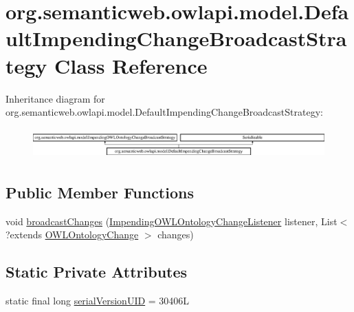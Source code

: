 \hypertarget{classorg_1_1semanticweb_1_1owlapi_1_1model_1_1_default_impending_change_broadcast_strategy}{\section{org.\-semanticweb.\-owlapi.\-model.\-Default\-Impending\-Change\-Broadcast\-Strategy Class Reference}
\label{classorg_1_1semanticweb_1_1owlapi_1_1model_1_1_default_impending_change_broadcast_strategy}
}
Inheritance diagram for org.\-semanticweb.\-owlapi.\-model.\-Default\-Impending\-Change\-Broadcast\-Strategy\-:\begin{figure}[H]
\begin{center}
\leavevmode
\includegraphics[height=1.166667cm]{classorg_1_1semanticweb_1_1owlapi_1_1model_1_1_default_impending_change_broadcast_strategy}
\end{center}
\end{figure}
\subsection*{Public Member Functions}
\begin{DoxyCompactItemize}
\item 
void \hyperlink{classorg_1_1semanticweb_1_1owlapi_1_1model_1_1_default_impending_change_broadcast_strategy_a1d03697fd178c0b4ca1d66fd7060c265}{broadcast\-Changes} (\hyperlink{interfaceorg_1_1semanticweb_1_1owlapi_1_1model_1_1_impending_o_w_l_ontology_change_listener}{Impending\-O\-W\-L\-Ontology\-Change\-Listener} listener, List$<$?extends \hyperlink{classorg_1_1semanticweb_1_1owlapi_1_1model_1_1_o_w_l_ontology_change}{O\-W\-L\-Ontology\-Change} $>$ changes)
\end{DoxyCompactItemize}
\subsection*{Static Private Attributes}
\begin{DoxyCompactItemize}
\item 
static final long \hyperlink{classorg_1_1semanticweb_1_1owlapi_1_1model_1_1_default_impending_change_broadcast_strategy_afe93a1e8165dcbe13b5b58a5929ff385}{serial\-Version\-U\-I\-D} = 30406\-L
\end{DoxyCompactItemize}


